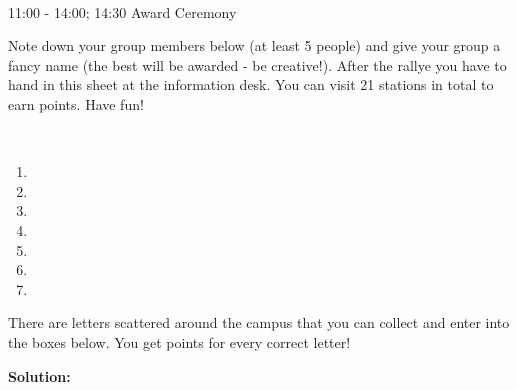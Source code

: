 \documentclass[20pt,a4paper,ngerman]{scrbook}
\begin{document}
	{
		\noindent
		\begin{description}
			\item[Group number/name: \thestno ] \dotfill \\
			\item[Time:] 11:00 - 14:00; 14:30 Award Ceremony
			\item[Manual:] Note down your group members below (at least 5 people) and give your group a fancy name (the best will be awarded - be creative!). After the rallye you have to hand in this sheet at the information desk. You can visit 21 stations in total to earn points. Have fun!
			\item[Participants:] \hfill \\
				\begin{enumerate}
					\item \dotfill
					\item \dotfill
					\item \dotfill
					\item \dotfill
					\item \dotfill
					\item \dotfill
					\item \dotfill
				\end{enumerate}
			\item [Scavenger Hunt:] There are letters scattered around the campus that you can collect and enter into the boxes below. You get points for every correct letter!

			\item\textbf{Solution:}
			\begin{tabular}{| l | c | c | c | c | c | c | c | c | c | c | r |}
			    \hline
			     \hspace{1em} & \hspace{1em} & \hspace{1em} & \hspace{1em} & \hspace{1em} &  \hspace{1em} &  \hspace{1em} &  \hspace{1em} \\
			    \hline
			\end{tabular} \quad
					\\
					

\end{description}}
\end{document}
